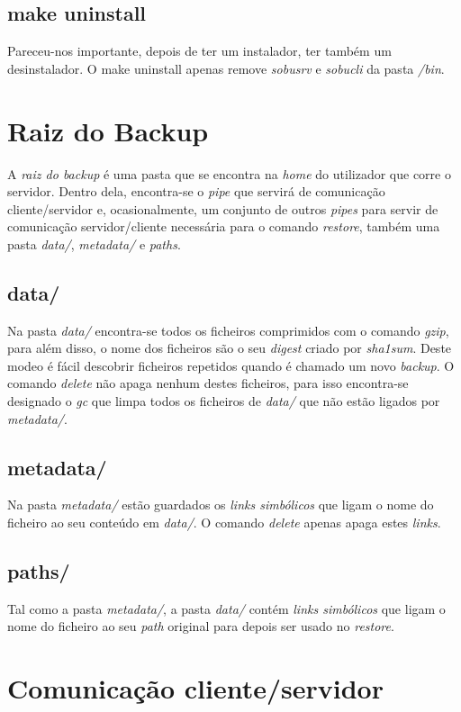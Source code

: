 \documentclass[12pt,a4paper]{report}
\begin{document}
\section{make uninstall}
Pareceu-nos importante, depois de ter um instalador, ter também um desinstalador. O make uninstall apenas remove \emph{sobusrv} e \emph{sobucli} da pasta \emph{/bin}.

\chapter{Raiz do Backup}
A \emph{raiz do backup} é uma pasta que se encontra na \emph{home} do utilizador que corre o servidor. Dentro dela, encontra-se o \emph{pipe} que servirá de comunicação cliente/servidor e, ocasionalmente, um conjunto de outros \emph{pipes} para servir de comunicação servidor/cliente necessária para o comando \emph{restore}, também uma pasta \emph{data/}, \emph{metadata/} e \emph{paths}.\par

\section{data/}
Na pasta \emph{data/} encontra-se todos os ficheiros comprimidos com o comando \emph{gzip}, para além disso, o nome dos ficheiros são o seu \emph{digest} criado por \emph{sha1sum}. Deste modeo é fácil descobrir ficheiros repetidos quando é chamado um novo \emph{backup}. O comando \emph{delete} não apaga nenhum destes ficheiros, para isso encontra-se designado o \emph{gc} que limpa todos os ficheiros de \emph{data/} que não estão ligados por \emph{metadata/}.

\section{metadata/}
Na pasta \emph{metadata/} estão guardados os \emph{links simbólicos} que ligam o nome do ficheiro ao seu conteúdo em \emph{data/}. O comando \emph{delete} apenas apaga estes \emph{links}.

\section{paths/}
Tal como a pasta \emph{metadata/}, a pasta \emph{data/} contém \emph{links simbólicos} que ligam o nome do ficheiro ao seu \emph{path} original para depois ser usado no \emph{restore}.

\chapter{Comunicação cliente/servidor}
\end{document}
